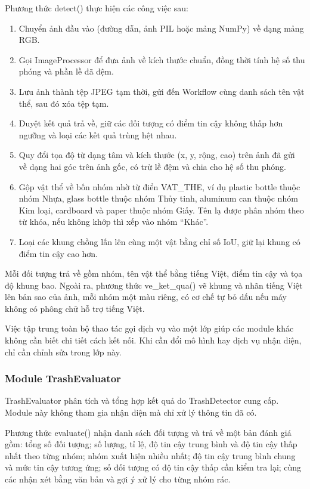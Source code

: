 \documentclass[a4paper,13pt]{extarticle}
\begin{document}
Phương thức detect() thực hiện các công việc sau:
\begin{enumerate}
    \item Chuyển ảnh đầu vào (đường dẫn, ảnh PIL hoặc mảng NumPy) về dạng mảng RGB.
    \item Gọi ImageProcessor để đưa ảnh về kích thước chuẩn, đồng thời tính hệ số thu phóng và phần lề đã đệm.
    \item Lưu ảnh thành tệp JPEG tạm thời, gửi đến Workflow cùng danh sách tên vật thể, sau đó xóa tệp tạm.
    \item Duyệt kết quả trả về, giữ các đối tượng có điểm tin cậy không thấp hơn ngưỡng và loại các kết quả trùng hệt nhau.
    \item Quy đổi tọa độ từ dạng tâm và kích thước (x, y, rộng, cao) trên ảnh đã gửi về dạng hai góc trên ảnh gốc, có trừ lề đệm và chia cho hệ số thu phóng.
    \item Gộp vật thể về bốn nhóm nhờ từ điển VAT\_THE, ví dụ plastic bottle thuộc nhóm Nhựa, glass bottle thuộc nhóm Thủy tinh, aluminum can thuộc nhóm Kim loại, cardboard và paper thuộc nhóm Giấy. Tên lạ được phân nhóm theo từ khóa, nếu không khớp thì xếp vào nhóm “Khác”.
    \item Loại các khung chồng lấn lên cùng một vật bằng chỉ số IoU, giữ lại khung có điểm tin cậy cao hơn.
\end{enumerate}

Mỗi đối tượng trả về gồm nhóm, tên vật thể bằng tiếng Việt, điểm tin cậy và tọa độ khung bao. Ngoài ra, phương thức ve\_ket\_qua() vẽ khung và nhãn tiếng Việt lên bản sao của ảnh, mỗi nhóm một màu riêng, có cơ chế tự bỏ dấu nếu máy không có phông chữ hỗ trợ tiếng Việt.

Việc tập trung toàn bộ thao tác gọi dịch vụ vào một lớp giúp các module khác không cần biết chi tiết cách kết nối. Khi cần đổi mô hình hay dịch vụ nhận diện, chỉ cần chỉnh sửa trong lớp này.

\subsubsection{ Module TrashEvaluator}

TrashEvaluator phân tích và tổng hợp kết quả do TrashDetector cung cấp. Module này không tham gia nhận diện mà chỉ xử lý thông tin đã có.

Phương thức evaluate() nhận danh sách đối tượng và trả về một bản đánh giá gồm: tổng số đối tượng; số lượng, tỉ lệ, độ tin cậy trung bình và độ tin cậy thấp nhất theo từng nhóm; nhóm xuất hiện nhiều nhất; độ tin cậy trung bình chung và mức tin cậy tương ứng; số đối tượng có độ tin cậy thấp cần kiểm tra lại; cùng các nhận xét bằng văn bản và gợi ý xử lý cho từng nhóm rác.
\end{document}

